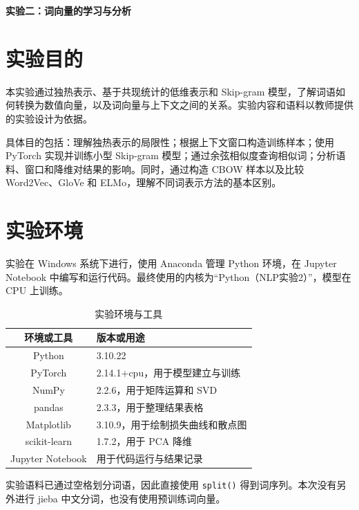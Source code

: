 \documentclass[UTF8,a4paper,zihao=-4,fontset=none]{ctexart}
\providecommand{\heiti}{\CJKfamily{zhhei}}
\newcommand{\ReportTableHead}[1]{\textbf{#1}}
\begin{document}
\pagestyle{plain}
\begin{center}
  {\heiti{}\bfseries 实验二：词向量的学习与分析\par}
\end{center}
\tableofcontents
\clearpage
\pagestyle{fancy}

\section{实验目的}

本实验通过独热表示、基于共现统计的低维表示和 Skip-gram 模型，了解词语如何转换为数值向量，以及词向量与上下文之间的关系。实验内容和语料以教师提供的实验设计为依据\cite{lab}。

具体目的包括：理解独热表示的局限性；根据上下文窗口构造训练样本；使用 PyTorch 实现并训练小型 Skip-gram 模型；通过余弦相似度查询相似词；分析语料、窗口和降维对结果的影响。同时，通过构造 CBOW 样本以及比较 Word2Vec、GloVe 和 ELMo，理解不同词表示方法的基本区别。

\section{实验环境}

实验在 Windows 系统下进行，使用 Anaconda 管理 Python 环境，在 Jupyter Notebook 中编写和运行代码。最终使用的内核为“Python（NLP实验2）”，模型在 CPU 上训练。

\begin{table}[htbp]
\centering\small
\caption{实验环境与工具}\label{tab:environment}
\begin{tabularx}{\linewidth}{cY}
\toprule
\ReportTableHead{环境或工具} & \ReportTableHead{版本或用途}\\
\midrule
Python & 3.10.22\\
PyTorch & 2.14.1+cpu，用于模型建立与训练\\
NumPy & 2.2.6，用于矩阵运算和 SVD\\
pandas & 2.3.3，用于整理结果表格\\
Matplotlib & 3.10.9，用于绘制损失曲线和散点图\\
scikit-learn & 1.7.2，用于 PCA 降维\\
Jupyter Notebook & 用于代码运行与结果记录\\
\bottomrule
\end{tabularx}
\end{table}

实验语料已通过空格划分词语，因此直接使用 \texttt{split()} 得到词序列。本次没有另外进行 jieba 中文分词，也没有使用预训练词向量。
\end{document}
